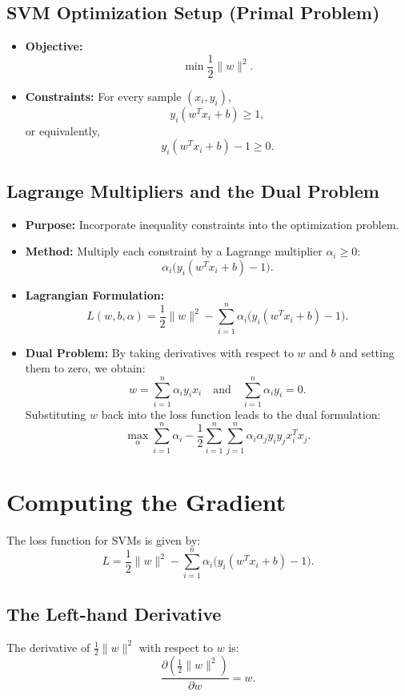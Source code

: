 \subsection{SVM Optimization Setup (Primal Problem)}
\begin{itemize}
    \item \textbf{Objective:}
    \[
    \min \frac{1}{2}\|w\|^2.
    \]
    \item \textbf{Constraints:} For every sample \((x_i, y_i)\),
    \[
    y_i (w^T x_i + b) \geq 1,
    \]
    or equivalently,
    \[
    y_i (w^T x_i + b) - 1 \geq 0.
    \]
\end{itemize}

\subsection{Lagrange Multipliers and the Dual Problem}
\begin{itemize}
    \item \textbf{Purpose:} Incorporate inequality constraints into the optimization problem.
    \item \textbf{Method:} Multiply each constraint by a Lagrange multiplier \(\alpha_i \geq 0\):
    \[
    \alpha_i \bigl( y_i (w^T x_i + b) - 1 \bigr).
    \]
    \item \textbf{Lagrangian Formulation:}
    \[
    L(w, b, \alpha) = \frac{1}{2}\|w\|^2 - \sum_{i=1}^{n} \alpha_i \bigl( y_i (w^T x_i + b) - 1 \bigr).
    \]
    \item \textbf{Dual Problem:} By taking derivatives with respect to \(w\) and \(b\) and setting them to zero, we obtain:
    \[
    w = \sum_{i=1}^{n} \alpha_i y_i x_i \quad \text{and} \quad \sum_{i=1}^{n} \alpha_i y_i = 0.
    \]
    Substituting \(w\) back into the loss function leads to the dual formulation:
    \[
    \max_{\alpha} \sum_{i=1}^{n} \alpha_i - \frac{1}{2} \sum_{i=1}^{n} \sum_{j=1}^{n} \alpha_i \alpha_j y_i y_j x_i^T x_j.
    \]
\end{itemize}

\section{Computing the Gradient}

The loss function for SVMs is given by:
\[
L = \frac{1}{2}\|w\|^2 - \sum_{i=1}^{n} \alpha_i \bigl( y_i (w^T x_i + b) - 1 \bigr).
\]

\subsection{The Left-hand Derivative}
The derivative of \(\frac{1}{2}\|w\|^2\) with respect to \(w\) is:
\[
\frac{\partial \left(\frac{1}{2}\|w\|^2\right)}{\partial w} = w.
\]

